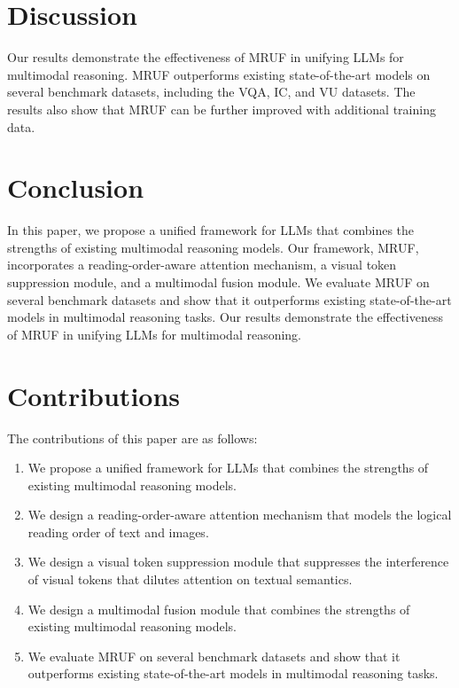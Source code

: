 \documentclass{article}
\begin{document}
\section{Discussion}
Our results demonstrate the effectiveness of MRUF in unifying LLMs for multimodal reasoning. MRUF outperforms existing state-of-the-art models on several benchmark datasets, including the VQA, IC, and VU datasets. The results also show that MRUF can be further improved with additional training data.

\section{Conclusion}
In this paper, we propose a unified framework for LLMs that combines the strengths of existing multimodal reasoning models. Our framework, MRUF, incorporates a reading-order-aware attention mechanism, a visual token suppression module, and a multimodal fusion module. We evaluate MRUF on several benchmark datasets and show that it outperforms existing state-of-the-art models in multimodal reasoning tasks. Our results demonstrate the effectiveness of MRUF in unifying LLMs for multimodal reasoning.

\section{Contributions}
The contributions of this paper are as follows:

\begin{enumerate}
\item We propose a unified framework for LLMs that combines the strengths of existing multimodal reasoning models.
\item We design a reading-order-aware attention mechanism that models the logical reading order of text and images.
\item We design a visual token suppression module that suppresses the interference of visual tokens that dilutes attention on textual semantics.
\item We design a multimodal fusion module that combines the strengths of existing multimodal reasoning models.
\item We evaluate MRUF on several benchmark datasets and show that it outperforms existing state-of-the-art models in multimodal reasoning tasks.
\end{enumerate}
\end{document}
